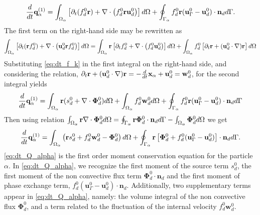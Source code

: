 \begin{equation}
    \frac{d}{dt} \textbf{q}^{(1)}_\alpha
      =  \int_{\Omega_{\alpha}} \left[
        \partial_t(  f_d^0\textbf{r})
        + \mathbf{\nabla}\cdot \left(  f_d^0 \textbf{r}\textbf{u}_d^0\right)
    \right] d\Omega 
    + \oint_{\Gamma_{\alpha}}   f_d^0 \textbf{r}  (\textbf{u}_\Gamma^0-\textbf{u}_d^0)\cdot \textbf{n}_d d\Gamma.
\end{equation}
The first term on the right-hand side may be rewritten as
\begin{equation}
\int_{\Omega_{\alpha}}  \left[
        \partial_t(\textbf{r}  f_d^0)+ \mathbf{\nabla}\cdot \left( \textbf{u}_d^0 \textbf{r} f^0_d\right) 
    \right] d\Omega
    = \int_{\Omega_{\alpha}} \textbf{r}\left[
        \partial_t f_d^0
        + \mathbf{\nabla}\cdot \left(f_d^0 \textbf{u}_d^0\right)
    \right]  d\Omega
    + \int_{\Omega_{\alpha}}  f_d^0 \left[
        \partial_t \textbf{r}
        +(\textbf{u}_d^0 \cdot \mathbf{\nabla}) \textbf{r}
    \right] d\Omega
\end{equation}
Substituting \ref{eq:dt_f_k} in the first integral on the right-hand side, and considering the relation,
$  \partial_t \textbf{r}
+ (\textbf{u}_d^0 \cdot \mathbf{\nabla}) \textbf{r}
= - \frac{d}{dt} \textbf{x}_\alpha  + \textbf{u}_d^0 
= \textbf{w}_d^0$,
for the second integral yields 
\begin{align}
    \frac{d}{dt} \textbf{q}^{(1)}_\alpha = \int_{\Omega_{\alpha}} \textbf{r} (s_d^0 +\mathbf{\nabla}\cdot \bm\Phi_d^0)   d\Omega
    + \int_{\Omega_{\alpha}}  f_d^0\textbf{w}_d^0  d\Omega  + \oint_{\Gamma_{\alpha}}   f_d^0 \textbf{r}  (\textbf{u}_\Gamma^0-\textbf{u}_d^0)\cdot \textbf{n}_d d\Gamma
\end{align}
Then using relation $\int_{\Omega_{\alpha}} \textbf{r}  \mathbf{\nabla}\cdot \bm\Phi_d^0  d\Omega
= \oint_{\Gamma_{\alpha}}  \textbf{r} \bm\Phi_d^0 \cdot \textbf{n}_d  d\Gamma
- \int_{\Omega_{\alpha}}  \bm\Phi_d^0  d\Omega$ we get
\begin{align}
    \frac{d}{dt} \textbf{q}^{(1)}_\alpha
    = \intO{\left( 
        \textbf{r} s_d^0  
        + f_d^0  \textbf{w}_d^0
        - \bm\Phi_d^0
    \right) }
    + \intS{\textbf{r} \left[
        \bm\Phi_d^0
        + f_d^0 (\textbf{u}_\Gamma^0-\textbf{u}_d^0)
    \right]\cdot \textbf{n}_d}  .
    \label{eq:dt_Q_alpha}
\end{align}
 \ref{eq:dt_Q_alpha} is the first order moment conservation equation for the particle $\alpha$. 
 In \ref{eq:dt_Q_alpha}, we recognize the first moment of the source term $s_d^0$, the first moment of the non convective flux term $\bm\Phi_d^0\cdot\textbf{n}_d$ and the first moment of phase exchange term, $f_d^0 (\textbf{u}_\Gamma^0-\textbf{u}_d^0)\cdot\textbf{n}_d$. 
 Additionally, two supplementary terms appear in \ref{eq:dt_Q_alpha}, namely: the volume integral of the non convective flux $\bm\Phi_d^0$, and a term related to the fluctuation of the internal velocity $f_d^0 \textbf{w}_d^0$.

